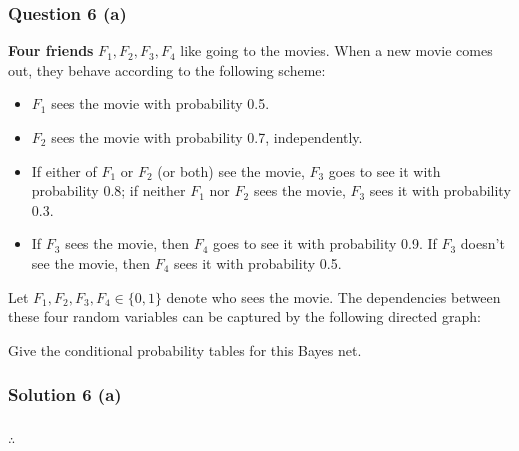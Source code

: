 \documentclass{article}
\begin{document}
\subsubsection*{Question 6 (a)}
\begin{flushleft}
    \textbf{Four friends} $F_1, F_2, F_3, F_4$ like going to the movies. 
    When a new movie comes out, they behave according to the following scheme: 
    \begin{itemize}
    \item $F_1$ sees the movie with probability 0.5. 
    \item $F_2$ sees the movie with probability 0.7, independently. 
    \item If either of $F_1$ or $F_2$ (or both) see the movie, $F_3$ goes to see it with probability 0.8; 
    if neither $F_1$ nor $F_2$ sees the movie, $F_3$ sees it with probability 0.3. 
    \item If $F_3$ sees the movie, then $F_4$ goes to see it with probability 0.9. 
    If $F_3$ doesn't see the movie, then $F_4$ sees it with probability 0.5. 
    \end{itemize}

    Let $F_1, F_2, F_3, F_4 \in \{0,1\}$ denote who sees the movie. 
    The dependencies between these four random variables can be captured by the following directed graph: 

    \begin{center}
    \end{center}

    Give the conditional probability tables for this Bayes net. 
\end{flushleft}

\subsubsection*{Solution 6 (a)}


\subsubsection*{\normalfont}{$\therefore$ }
\end{document}
